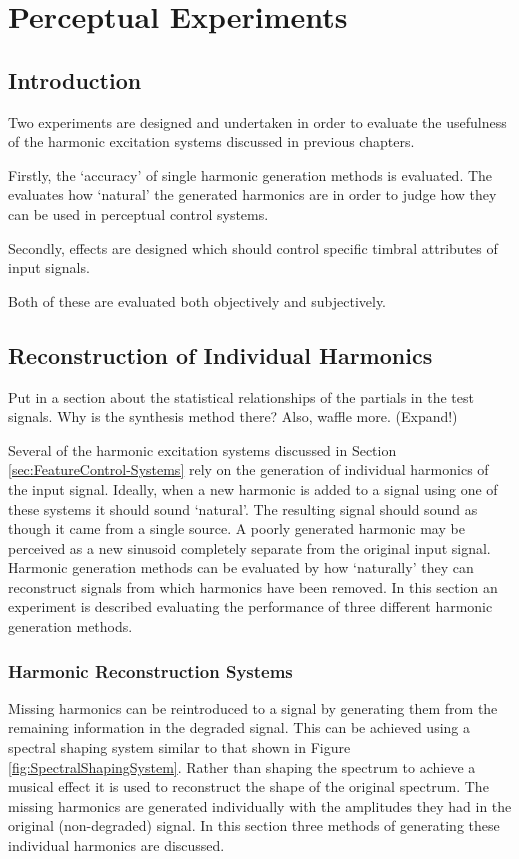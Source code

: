 \chapter{Perceptual Experiments}
\label{chap:PerceptualExperiments}

\section{Introduction}
\label{sec:PerceptualExperiments-Introduction}
	\note
	{
		Two experiments are designed and undertaken in order to evaluate the usefulness of the harmonic excitation
		systems discussed in previous chapters.

		Firstly, the `accuracy' of single harmonic generation methods is evaluated. The evaluates how `natural' the
		generated harmonics are in order to judge how they can be used in perceptual control systems.

		Secondly, effects are designed which should control specific timbral attributes of input signals.

		Both of these are evaluated both objectively and subjectively.
	}

\section{Reconstruction of Individual Harmonics}
\label{sec:PerceptualExperiments-Reconstruction}
	\note
	{
		Put in a section about the statistical relationships of the partials in the test signals.
		Why is the synthesis method there?
		Also, waffle more. (Expand!)
	}

	Several of the harmonic excitation systems discussed in Section \ref{sec:FeatureControl-Systems} rely on the
	generation of individual harmonics of the input signal. Ideally, when a new harmonic is added to a signal using one
	of these systems it should sound `natural'. The resulting signal should sound as though it came from a single
	source. A poorly generated harmonic may be perceived as a new sinusoid completely separate from the original input
	signal. Harmonic generation methods can be evaluated by how `naturally' they can reconstruct signals from which
	harmonics have been removed. In this section an experiment is described evaluating the performance of three
	different harmonic generation methods.

	\subsection{Harmonic Reconstruction Systems}
	\label{sec:PerceptualExperiments-Reconstruction-Systems}
		Missing harmonics can be reintroduced to a signal by generating them from the remaining information in the
		degraded signal. This can be achieved using a spectral shaping system similar to that shown in Figure
		\ref{fig:SpectralShapingSystem}. Rather than shaping the spectrum to achieve a musical effect it is used to
		reconstruct the shape of the original spectrum. The missing harmonics are generated individually with the
		amplitudes they had in the original (non-degraded) signal. In this section three methods of generating
		these individual harmonics are discussed.

